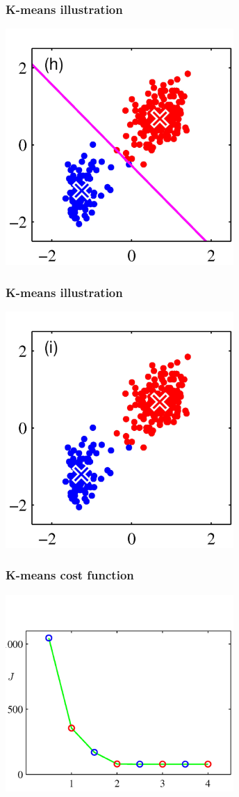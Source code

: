 \documentclass[12pt,notes,mathserif]{beamer}
\begin{document}
\begin{frame}[c]
	\frametitle{K-means illustration}
	\begin{center}
		\includegraphics[width=0.65\textwidth]{fig/lec725.jpg}
	\end{center}
\end{frame}
\begin{frame}[c]
	\frametitle{K-means illustration}
	\begin{center}
		\includegraphics[width=0.65\textwidth]{fig/lec726.jpg}
	\end{center}
\end{frame}
\begin{frame}[c]
	\frametitle{K-means cost function}
	\begin{center}
		\includegraphics[width=0.65\textwidth]{fig/lec727.jpg}
	\end{center}
\end{frame}
\end{document}
